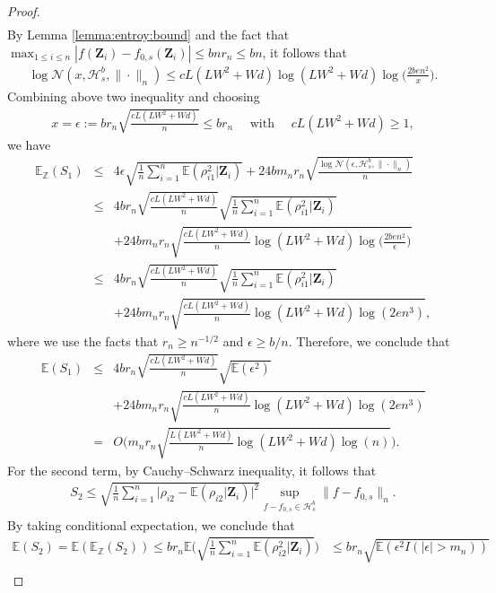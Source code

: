 \documentclass[11pt, preprint]{imsart}
\numberwithin{equation}{section}
\def \mcH{\mathcal{H}}
\def \mcN{\mathcal{N}}
\def \bfZ{\mathbf{Z}}
\def \ev{\mathbb{E}}
\theoremstyle{plain}
\theoremstyle{definition}
\begin{document}
\begin{proof}
\begin{eqnarray}
\end{eqnarray}
By Lemma \ref{lemma:entroy:bound} and the fact that $\max_{1\leq i\leq n}|f(\bfZ_i)-f_{0,s}(\bfZ_i)|\leq bnr_n\leq bn$, it follows that 
\begin{eqnarray}
	\log \mcN(x, \mcH_s^b, \|\cdot\|_n)\leq cL(LW^2+Wd)\log(LW^2+Wd)\log\bigg(\frac{2ben^2}{x}\bigg).\nonumber
\end{eqnarray}
Combining above two inequality and choosing
\begin{eqnarray}
	x=\epsilon:=br_n\sqrt{\frac{cL(LW^2+Wd)}{n}}\leq br_n\quad \textrm{ with }\quad cL(LW^2+Wd)\geq 1,\nonumber
\end{eqnarray}
we have
\begin{eqnarray}
	\ev_{\mathbb{Z}}(S_1)&\leq& 4\epsilon\sqrt{\frac{1}{n}\sum_{i=1}^n\ev(\rho_{i1}^2|\bfZ_i)}+24bm_nr_n\sqrt{\frac{\log \mcN(\epsilon, \mcH_s^b, \|\cdot\|_n)}{n}}\nonumber\\
	&\leq& 4br_n\sqrt{\frac{cL(LW^2+Wd)}{n}}\sqrt{\frac{1}{n}\sum_{i=1}^n\ev(\rho_{i1}^2|\bfZ_i)}\nonumber\\
	&&+24bm_nr_n\sqrt{\frac{cL(LW^2+Wd)}{n}\log(LW^2+Wd)\log\bigg(\frac{2ben^2}{\epsilon}\bigg)}\nonumber\\
		&\leq& 4br_n\sqrt{\frac{cL(LW^2+Wd)}{n}}\sqrt{\frac{1}{n}\sum_{i=1}^n\ev(\rho_{i1}^2|\bfZ_i)}\nonumber\\
	&&+24bm_nr_n\sqrt{\frac{cL(LW^2+Wd)}{n}\log(LW^2+Wd)\log(2en^3)},\nonumber
\end{eqnarray}
where we use the facts that $r_n\geq n^{-1/2}$ and $\epsilon\geq b/n$. Therefore, we conclude that
\begin{eqnarray}
	\ev(S_1)&\leq& 4br_n\sqrt{\frac{cL(LW^2+Wd)}{n}}\sqrt{\ev(\epsilon^2)}\nonumber\\
	&&+24bm_nr_n\sqrt{\frac{cL(LW^2+Wd)}{n}\log(LW^2+Wd)\log(2en^3)}\nonumber\\
	&=&O\bigg(m_nr_n\sqrt{\frac{L(LW^2+Wd)}{n}\log(LW^2+Wd)\log(n)}\bigg).\label{eq:lemma:difference:rate:3:eq1}
\end{eqnarray}
For the second term, by Cauchy–Schwarz inequality, it follows that
\begin{eqnarray}
	S_2\leq \sqrt{\frac{1}{n}\sum_{i=1}^n\bigg|\rho_{i2}-\ev(\rho_{i2}|\bfZ_i)\bigg|^2}\sup_{f-f_{0,s}\in\mcH_s^b}\|f-f_{0,s}\|_n.\nonumber
\end{eqnarray}
By taking conditional expectation, we conclude that
\begin{align}
	\ev(S_2)=\ev(\ev_{\mathbb{Z}}(S_2))\leq br_n\ev\bigg(\sqrt{\frac{1}{n}\sum_{i=1}^n\ev(\rho_{i2}^2|\bfZ_i)}\bigg)&\leq br_n\sqrt{\ev(\epsilon^2I(|\epsilon|>m_n))}\nonumber\\

\end{align}
\end{proof}
\end{document}
